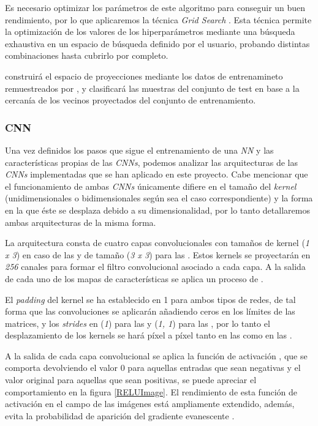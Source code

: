             Es necesario optimizar los parámetros de este algoritmo para conseguir un buen rendimiento, por lo que aplicaremos la técnica \textit{Grid Search} \cite{GridSearchSklearnLibrary}. Esta técnica permite la optimización de los valores de los hiperparámetros mediante una búsqueda exhaustiva en un espacio de búsqueda definido por el usuario, probando distintas combinaciones hasta cubrirlo por completo. 

             construirá el espacio de proyecciones mediante los datos de entrenamineto remuestreados por , y clasificará las muestras del conjunto de test en base a la cercanía de los vecinos proyectados del conjunto de entrenamiento.


        \subsubsection{CNN}

            Una vez definidos los pasos que sigue el entrenamiento de una \textit{NN} y las características propias de las \textit{CNNs}, podemos analizar las arquitecturas de las \textit{CNNs} implementadas que se han aplicado en este proyecto. Cabe mencionar que el funcionamiento de ambas \textit{CNNs} únicamente difiere en el tamaño del \textit{kernel} (unidimensionales o bidimensionales según sea el caso correspondiente) y la forma en la que éste se desplaza debido a su dimensionalidad, por lo tanto detallaremos ambas arquitecturas de la misma forma.

            La arquitectura consta de cuatro capas convolucionales con tamaños de kernel (\textit{1 x 3}) en caso de las  y de tamaño (\textit{3 x 3}) para las . Estos kernels se proyectarán en \textit{256} canales para formar el filtro convolucional asociado a cada capa. A la salida de cada uno de los mapas de características se aplica un proceso de .

            El \textit{padding} del kernel se ha establecido en 1 para ambos tipos de redes, de tal forma que las convoluciones se aplicarán añadiendo ceros en los límites de las matrices, y los \textit{strides} en (\textit{1}) para las  y (\textit{1, 1}) para las , por lo tanto el desplazamiento de los kernels se hará píxel a píxel tanto en las  como en las .

            A la salida de cada capa convolucional se aplica la función de activación , que se comporta devolviendo el valor $0$ para aquellas entradas que sean negativas y el valor original para aquellas que sean positivas, se puede apreciar el comportamiento en la figura \ref{RELUImage}. El rendimiento de esta función de activación en el campo de las imágenes está ampliamente extendido, además, evita la probabilidad de aparición del gradiente evanescente \cite{GradientVanishingRelu}.

